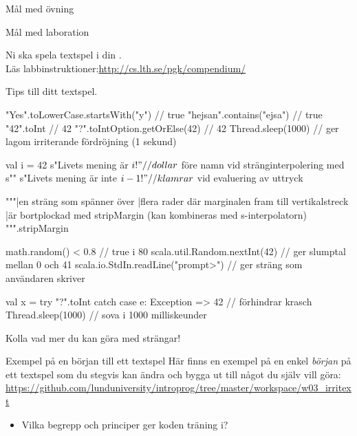 \ifkompendium\else

	\begin{SlideExtra}{Mål med övning \ExeWeekTHREE}
		\begin{itemize}\SlideFontSmall
			
		\end{itemize}
	\end{SlideExtra}

	\begin{SlideExtra}{Mål med laboration \LabWeekTHREE}
		\begin{itemize}
			
		\end{itemize}
		Ni ska spela  textspel i din .\\
		Läs labbinstruktioner:\url{http://cs.lth.se/pgk/compendium/}
	\end{SlideExtra}

	\begin{SlideExtra}{Tips till ditt textspel.}
		\begin{CodeSmall}
			"Yes".toLowerCase.startsWith("y")    // true
			"hejsan".contains("ejsa")            // true
			"42".toInt                           // 42
			"?".toIntOption.getOrElse(42)        // 42
			Thread.sleep(1000)                   // ger lagom irriterande fördröjning (1 sekund)

			val i = 42
			s"Livets mening är $i!" // dollar $ före namn vid stränginterpolering med s""
			s"Livets mening är inte ${i-1}!"  // klamrar ${} vid evaluering av uttryck

			"""|en sträng som spänner över
			|flera rader där marginalen fram till vertikalstreck
			|är bortplockad med stripMargin (kan kombineras med s-interpolatorn)
			""".stripMargin

			math.random() < 0.8                  // true i 80%
			scala.util.Random.nextInt(42)      // ger slumptal mellan 0 och 41
			scala.io.StdIn.readLine("prompt>") // ger sträng som användaren skriver

			val x = try { "?".toInt } catch { case e: Exception => 42 }  // förhindrar krasch
			Thread.sleep(1000)    // sova i 1000 milliskeunder
		\end{CodeSmall}
		Kolla  vad mer du kan göra med strängar!
	\end{SlideExtra}

	\begin{SlideExtra}{Exempel på en början till ett textspel}
		Här finns en exempel på en enkel \emph{början} på ett textspel som du stegvis kan ändra och bygga ut till något du själv vill göra:
		\url{https://github.com/lunduniversity/introprog/tree/master/workspace/w03_irritext}

		\begin{itemize}
			\item Vilka begrepp och principer ger koden träning i?
		\end{itemize}

	\end{SlideExtra}

